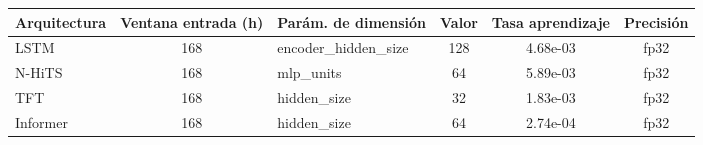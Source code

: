 \begin{tabular}{lclccc}
\toprule
Arquitectura & Ventana entrada (h) & Parám. de dimensión & Valor & Tasa aprendizaje & Precisión \\
\midrule
LSTM & 168 & encoder\_hidden\_size & 128 & 4.68e-03 & fp32 \\
N-HiTS & 168 & mlp\_units & 64 & 5.89e-03 & fp32 \\
TFT & 168 & hidden\_size & 32 & 1.83e-03 & fp32 \\
Informer & 168 & hidden\_size & 64 & 2.74e-04 & fp32 \\
\bottomrule
\end{tabular}